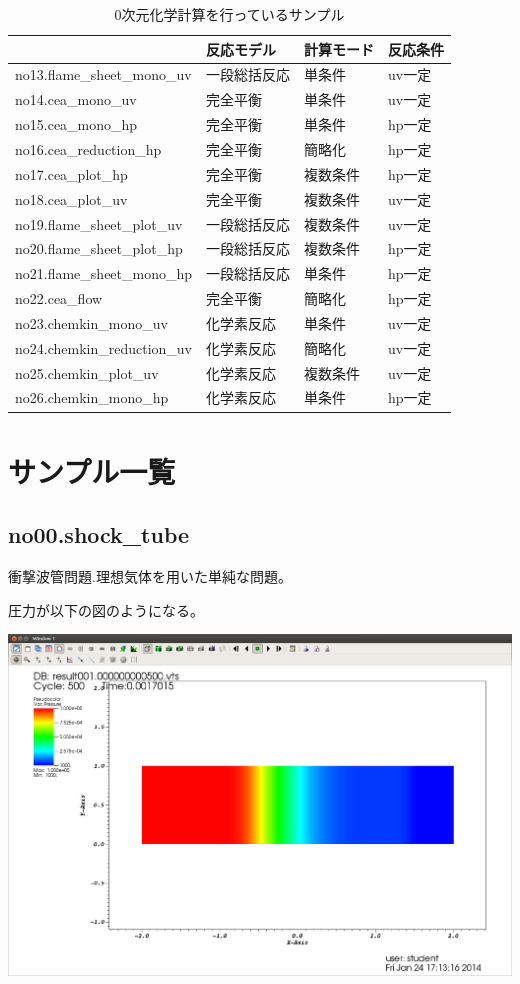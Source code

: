 \documentclass{jsarticle}
\begin{document}
\begin{table}%
\centering
\caption{0次元化学計算を行っているサンプル}
\begin{tabular}{llll}
 & 反応モデル & 計算モード & 反応条件 \\
\hline
no13.flame\_sheet\_mono\_uv       & 一段総括反応 & 単条件   & uv一定 \\
no14.cea\_mono\_uv                & 完全平衡     & 単条件   & uv一定 \\
no15.cea\_mono\_hp                & 完全平衡     & 単条件   & hp一定 \\
no16.cea\_reduction\_hp           & 完全平衡     & 簡略化   & hp一定 \\
no17.cea\_plot\_hp                & 完全平衡     & 複数条件 & hp一定 \\
no18.cea\_plot\_uv                & 完全平衡     & 複数条件 & uv一定 \\
no19.flame\_sheet\_plot\_uv       & 一段総括反応 & 複数条件 & uv一定 \\
no20.flame\_sheet\_plot\_hp       & 一段総括反応 & 複数条件 & hp一定 \\
no21.flame\_sheet\_mono\_hp       & 一段総括反応 & 単条件   & hp一定 \\
no22.cea\_flow                    & 完全平衡     & 簡略化   & hp一定 \\
no23.chemkin\_mono\_uv            & 化学素反応   & 単条件   & uv一定 \\
no24.chemkin\_reduction\_uv       & 化学素反応   & 簡略化   & uv一定 \\
no25.chemkin\_plot\_uv            & 化学素反応   & 複数条件 & uv一定 \\
no26.chemkin\_mono\_hp            & 化学素反応   & 単条件   & hp一定 \\
\hline
\end{tabular}
\end{table}%
\newpage
\hspace{1em}
\newpage
\section{サンプル一覧}%
\subsection{no00.shock\_tube}%
衝撃波管問題.理想気体を用いた単純な問題。

圧力が以下の図のようになる。
\begin{center}
\includegraphics[width=.6\textwidth,bb=0 0 1556 1054]{sample/no00.png}
\end{center}
\end{document}
